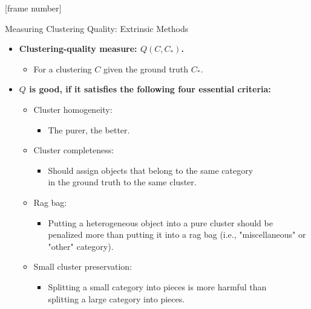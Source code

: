 \documentclass[aspectratio=169,t,xcolor=dvipsnames]{beamer}
\begin{document}
  {
    [frame number]
    \begin{frame}{Measuring Clustering Quality: Extrinsic Methods}
      \begin{itemize}
        \item \textbf{Clustering-quality measure: $Q(C,C_*)$.}
        \begin{itemize}
          \item For a clustering $C$ given the ground truth $C_*$.
        \end{itemize}
        \item \textbf{$Q$ is good, if it satisfies the following four essential criteria:}
        \begin{itemize}
          \item Cluster homogeneity:
          \begin{itemize}
            \item The purer, the better.
          \end{itemize}
          \item Cluster completeness:
          \begin{itemize}
            \item Should assign objects that belong to the same category \\
            in the ground truth to the same cluster.
          \end{itemize}
          \item Rag bag:
          \begin{itemize}
            \item Putting a heterogeneous object into a pure cluster should be penalized more than putting it into a rag bag (i.e., "miscellaneous" or "other" category).
          \end{itemize}
          \item Small cluster preservation:
          \begin{itemize}
            \item Splitting a small category into pieces is more harmful than \\
            splitting a large category into pieces.
          \end{itemize}
        \end{itemize}
      \end{itemize}
    \end{frame}
  }
\end{document}
